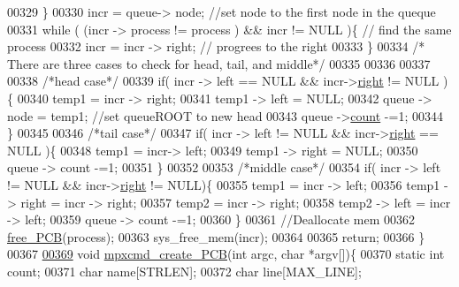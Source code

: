 \begin{DoxyCode}
{{00329         \}
00330         incr = queue-> node; \textcolor{comment}{//set node to the first node in the queque}
00331         \textcolor{keywordflow}{while} ( (incr -> process != process ) && incr != NULL )\{ \textcolor{comment}{// find the same
       process}
00332                         incr = incr -> right; \textcolor{comment}{// progrees to the right }
00333         \}
00334         \textcolor{comment}{/* There are three cases to check for head, tail, and middle*/}
00335         
00336         
00337         
00338         \textcolor{comment}{/*head case*/}
00339         \textcolor{keywordflow}{if}( incr -> left == NULL && incr->\hyperlink{structpage_a59bb1b5eca2d579befcc93a2833f4dfd}{right} != NULL )\{ 
00340                 temp1 = incr -> right;
00341                 temp1 -> left  = NULL;
00342                 queue -> node = temp1; \textcolor{comment}{//set queueROOT to new head}
00343                 queue ->\hyperlink{structroot_afa78d0408d4af29e936332a04739d59c}{count} -=1;
00344         \}
00345         
00346         \textcolor{comment}{/*tail case*/}
00347         \textcolor{keywordflow}{if}( incr -> left != NULL && incr->\hyperlink{structpage_a59bb1b5eca2d579befcc93a2833f4dfd}{right} == NULL )\{
00348                 temp1 = incr-> left;
00349                 temp1 -> right  = NULL;
00350                 queue -> count -=1;
00351         \}
00352         
00353         \textcolor{comment}{/*middle case*/}
00354         \textcolor{keywordflow}{if}( incr -> left != NULL && incr->\hyperlink{structpage_a59bb1b5eca2d579befcc93a2833f4dfd}{right} != NULL)\{
00355                 temp1 = incr -> left;
00356                 temp1 -> right = incr -> right;
00357                 temp2 = incr -> right;
00358                 temp2 -> left = incr -> left;
00359                 queue -> count -=1;
00360         \}
00361         \textcolor{comment}{//Deallocate mem}
00362         \hyperlink{mpx__r2_8c_a79890f055b1d0fccf1962bbde4877caa}{free_PCB}(process);
00363         sys\_free\_mem(incr);
00364         
00365         \textcolor{keywordflow}{return};
00366         \}
00367 
\hypertarget{mpx__r2_8c_source_l00369}{}\hyperlink{mpx__r2_8h_a782285c58822e411fb75be1e65fe1104}{00369} \textcolor{keywordtype}{void} \hyperlink{mpx__r2_8c_a782285c58822e411fb75be1e65fe1104}{mpxcmd_create_PCB}(\textcolor{keywordtype}{int} argc, \textcolor{keywordtype}{char} *argv[])\{
00370         \textcolor{keyword}{static} \textcolor{keywordtype}{int} count;
00371         \textcolor{keywordtype}{char} name[STRLEN];
00372         \textcolor{keywordtype}{char} line[MAX\_LINE];
}}
\end{DoxyCode}
